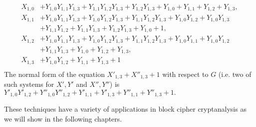 \begin{description}
\begin{align*}
X_{1,0} & + Y_{1,0}Y_{1,1}Y_{1,3} + Y_{1,1}Y_{1,2}Y_{1,3} + Y_{1,2}Y_{1,3} + Y_{1,0} + Y_{1,1} + Y_{1,2} + Y_{1,3},\\
X_{1,1} &+ Y_{1,0}Y_{1,1}Y_{1,3} + Y_{1,0}Y_{1,2}Y_{1,3} + Y_{1,1}Y_{1,2}Y_{1,3} + Y_{1,0}Y_{1,2} + Y_{1,0}Y_{1,3} \\
  & + Y_{1,1}Y_{1,2} + Y_{1,1}Y_{1,3} + Y_{1,2}Y_{1,3} + Y_{1,0} + 1,\\
X_{1,2} &+ Y_{1,0}Y_{1,1}Y_{1,3} + Y_{1,0}Y_{1,2}Y_{1,3} + Y_{1,1}Y_{1,2}Y_{1,3} + Y_{1,0}Y_{1,1} + Y_{1,0}Y_{1,2} \\
 & + Y_{1,1}Y_{1,3} + Y_{1,0} + Y_{1,2} + Y_{1,3},\\
X_{1,3} &+ Y_{1,0}Y_{1,2} + Y_{1,1} + Y_{1,3} + 1\\
\end{align*}
The normal form of the equation $X'_{1,3} + X''_{1,3} + 1$ with respect to $G$ (i.e. two of such systems for $X',Y'$ and $X'',Y''$)  is $Y'_{1,0}Y'_{1,2} + Y''_{1,0}Y''_{1,2} + Y'_{1,1} + Y'_{1,3} + Y''_{1,1} + Y''_{1,3} + 1.$
\end{description}

\vspace{1cm}

These techniques have a variety of applications in block cipher cryptanalysis as we will show in the following chapters.
